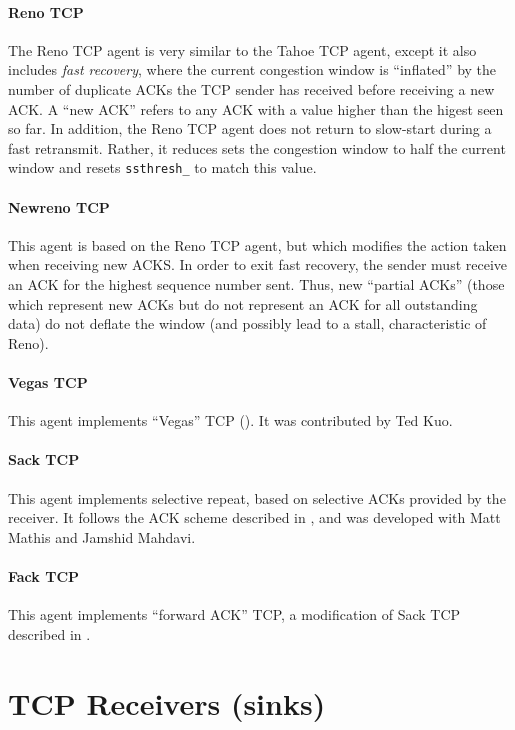\paragraph{Reno TCP}
The Reno TCP agent is very similar to the Tahoe TCP agent,
except it also includes {\em fast recovery}, where the current
congestion window is ``inflated'' by the number of duplicate ACKs
the TCP sender has received before receiving a new ACK.
A ``new ACK'' refers to any ACK with a value higher than the higest
seen so far.
In addition, the Reno TCP agent does not return to slow-start during
a fast retransmit.
Rather, it reduces sets the congestion window to half the current
window and resets {\tt ssthresh\_} to match this value.

\paragraph{Newreno TCP}
This agent is based on the Reno TCP agent, but which modifies the
action taken when receiving new ACKS.
In order to exit fast recovery, the sender must receive an ACK for the
highest sequence number sent.
Thus, new ``partial ACKs'' (those which represent new ACKs but do not
represent an ACK for all outstanding data) do not deflate the window
(and possibly lead to a stall, characteristic of Reno).

\paragraph{Vegas TCP}
This agent implements ``Vegas'' TCP (\cite{Brak94:TCP,Brak94a:TCP}).
It was contributed by Ted Kuo.

\paragraph{Sack TCP}
This agent implements selective repeat, based on selective ACKs provided
by the receiver.
It follows the ACK scheme described in \cite{rfc2018}, and was developed
with Matt Mathis and Jamshid Mahdavi.

\paragraph{Fack TCP}
This agent implements ``forward ACK'' TCP, a modification of Sack
TCP described in \cite{Math96:Forward}.

\section{TCP Receivers (sinks)}

